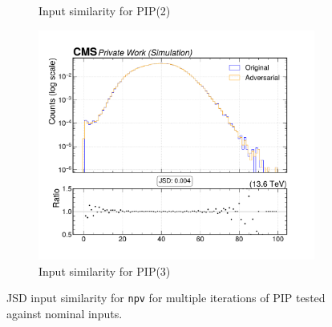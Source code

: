 \begin{figure}[htbp]
\begin{subfigure}[t]{0.32\textwidth}
    \caption{Input similarity for PIP(2)}
  \end{subfigure}\hfill
  \begin{subfigure}[t]{0.32\textwidth}
    \includegraphics[width=\linewidth]{media/output/features/compare/intprob_3/cmp_global_features_npv.pdf}
    \caption{Input similarity for PIP(3)}
  \end{subfigure}

  \caption{JSD input similarity for \texttt{npv} for multiple iterations of PIP tested against nominal inputs.}
  \label{fig:intprob_input_npv}
\end{figure}
